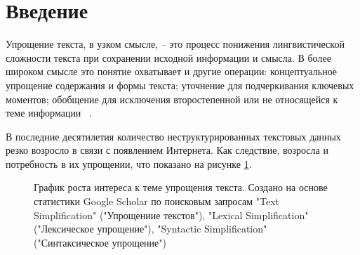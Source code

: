 \chapter*{Введение}



Упрощение текста, в узком смысле, -- это процесс понижения лингвистической сложности текста при сохранении исходной информации и смысла. В более широком смысле это понятие охватывает и другие операции: концептуальное упрощение содержания и формы текста; уточнение для подчеркивания ключевых моментов; обобщение для исключения второстепенной или не относящейся к теме информации ~\cite{sikka_survey_2020}.

В последние десятилетия количество неструктурированных текстовых данных резко возросло в связи с появлением Интернета. Как следствие, возросла и потребность в их упрощении, что показано на рисунке \ref{fig:growth_of_interest}. 

\begin{figure}[h!]
	
	
	\caption{График роста интереса к теме упрощения текста. Создано на основе статистики Google Scholar по поисковым запросам "Text Simplification" ("Упрощениие текстов"),  "Lexical Simplification" ("Лексическое упрощение"), "Syntactic Simplification" ("Синтаксическое упрощение")}
	
	\label{fig:growth_of_interest}
	
\end{figure}

